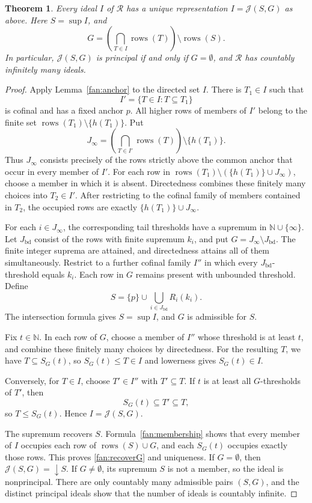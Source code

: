\documentclass[fleqn,preprint,3p,a4paper]{elsarticle}
\newtheorem{theorem}{Theorem}[section]
\theoremstyle{definition}
\newcommand{\N}{\mathbb N}
\newcommand{\RR}{\mathcal R}
\newcommand{\rows}{\operatorname{rows}}
\begin{document}
\begin{theorem}\label{fan:ideals}
Every ideal $I$ of $\RR$ has a unique representation $I=\mathcal J(S,G)$ as above. Here $S=\sup I$, and
\begin{equation}\label{fan:recoverG}
 G=\left(\bigcap_{T\in I}\rows(T)\right)\setminus\rows(S).
\end{equation}
In particular, $\mathcal J(S,G)$ is principal if and only if $G=\emptyset$, and $\RR$ has countably infinitely many ideals.
\end{theorem}
\begin{proof}
Apply Lemma~\ref{fan:anchor} to the directed set $I$. There is $T_1\in I$ such that
\[
 I' =\{T\in I:T\subseteq T_1\}
\]
is cofinal and has a fixed anchor $p$. All higher rows of members of $I'$ belong to the finite set $\rows(T_1)\setminus\{h(T_1)\}$. Put
\[
 J_\infty=\left(\bigcap_{T\in I'}\rows(T)\right)\setminus\{h(T_1)\}.
\]
Thus $J_\infty$ consists precisely of the rows strictly above the common anchor that occur in every member of $I'$. For each row in $\rows(T_1)\setminus(\{h(T_1)\}\cup J_\infty)$, choose a member in which it is absent. Directedness combines these finitely many choices into $T_2\in I'$. After restricting to the cofinal family of members contained in $T_2$, the occupied rows are exactly $\{h(T_1)\}\cup J_\infty$.

For each $i\in J_\infty$, the corresponding tail thresholds have a supremum in $\N\cup\{\infty\}$. Let $J_{\mathrm{bd}}$ consist of the rows with finite supremum $k_i$, and put $G=J_\infty\setminus J_{\mathrm{bd}}$. The finite integer suprema are attained, and directedness attains all of them simultaneously. Restrict to a further cofinal family $I''$ in which every $J_{\mathrm{bd}}$-threshold equals $k_i$. Each row in $G$ remains present with unbounded threshold. Define
\[
 S=\{p\}\cup\bigcup_{i\in J_{\mathrm{bd}}}R_i(k_i).
\]
The intersection formula gives $S=\sup I$, and $G$ is admissible for $S$.

Fix $t\in\N$. In each row of $G$, choose a member of $I''$ whose threshold is at least $t$, and combine these finitely many choices by directedness. For the resulting $T$, we have $T\subseteq S_G(t)$, so $S_G(t)\leq T\in I$ and lowerness gives $S_G(t)\in I$.

Conversely, for $T\in I$, choose $T'\in I''$ with $T'\subseteq T$. If $t$ is at least all $G$-thresholds of $T'$, then
\[
 S_G(t)\subseteq T'\subseteq T,
\]
so $T\leq S_G(t)$. Hence $I=\mathcal J(S,G)$.

The supremum recovers $S$. Formula~\eqref{fan:membership} shows that every member of $I$ occupies each row of $\rows(S)\cup G$, and each $S_G(t)$ occupies exactly those rows. This proves \eqref{fan:recoverG} and uniqueness. If $G=\emptyset$, then $\mathcal J(S,G)={\downarrow} S$. If $G\neq\emptyset$, its supremum $S$ is not a member, so the ideal is nonprincipal. There are only countably many admissible pairs $(S,G)$, and the distinct principal ideals show that the number of ideals is countably infinite.
\end{proof}
\end{document}
